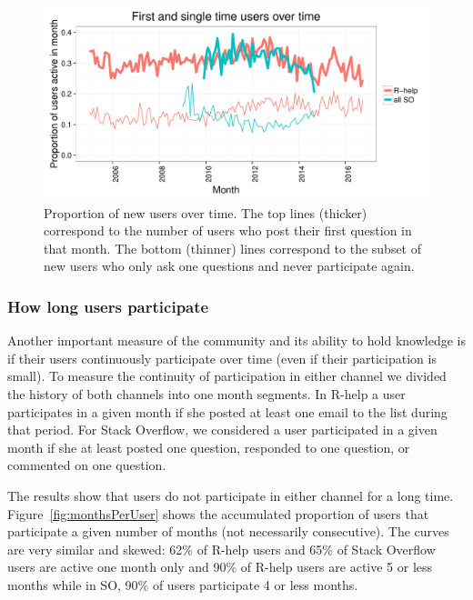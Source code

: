 \documentclass[smallextended]{svjour3}       %
\newcommand{\SO}{Stack Overflow\xspace}
\newcommand{\RH}{R-help\xspace}
\begin{document}
\begin{figure}[htbp]
  \centering
  \includegraphics[width=.95\textwidth]{figs/actByMonthUsers.pdf}
  \caption{Proportion of new users over time. The top lines (thicker) correspond to
    the number of users who post their first question in that month.
The bottom (thinner) lines  correspond to the subset of new users who only ask one
    questions and never participate again. }
  \label{fig:newusers}
\end{figure}

\subsubsection{How long users participate}

Another important measure of the community and its ability to hold knowledge is if their users continuously participate
over time (even if their participation is small). To measure the continuity of participation in either
channel we divided the history of both channels into one month segments. In \RH a user participates in a given month if she
posted at least one email to the list during that period. For \SO, we considered a user participated in a given month if she
at least posted one question, responded to one question, or commented on one question.

The results show that users do not participate in either channel for a long
time. Figure~\ref{fig:monthsPerUser} shows the accumulated proportion of users that participate a given number of
months (not necessarily consecutive). The curves are very similar and skewed: 62\% of \RH users and 65\% of \SO users are active one month only and
90\% of \RH users are active 5 or less months while in SO, 90\% of users participate 4 or less months.
\end{document}
